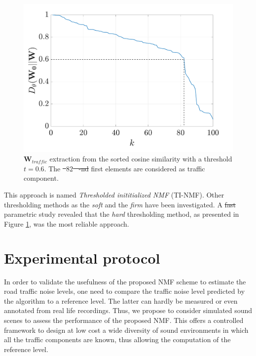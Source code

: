 \documentclass[twocolumn]{svjour3}          %
\providecommand{\DIFaddtex}[1]{{\protect\color{blue}\uwave{#1}}} %
\providecommand{\DIFdeltex}[1]{{\protect\color{red}\sout{#1}}}                      %
\providecommand{\DIFaddbegin}{} %
\providecommand{\DIFaddend}{} %
\providecommand{\DIFdelbegin}{} %
\providecommand{\DIFdelend}{} %
\providecommand{\DIFaddFL}[1]{\DIFadd{#1}} %
\providecommand{\DIFdelFL}[1]{\DIFdel{#1}} %
\providecommand{\DIFaddbeginFL}{} %
\providecommand{\DIFaddendFL}{} %
\providecommand{\DIFdelbeginFL}{} %
\providecommand{\DIFdelendFL}{} %
\providecommand{\DIFadd}[1]{\texorpdfstring{\DIFaddtex{#1}}{#1}} %
\providecommand{\DIFdel}[1]{\texorpdfstring{\DIFdeltex{#1}}{}} %
\begin{document}
\begin{figure}
[t]
\centering
\includegraphics[width=0.8\linewidth]{figures/distanceCosLinDisplay.pdf}
\caption{$\mathbf{W}_{traffic}$ extraction from the sorted cosine similarity with a threshold $t = 0.6$. The \DIFdelbeginFL \DIFdelFL{\mbox{%
$82$
}%
-nd }\DIFdelendFL first \DIFaddbeginFL \DIFaddFL{\mbox{%
$82$
}%
}\DIFaddendFL elements are \DIFaddbeginFL \DIFaddFL{here }\DIFaddendFL considered as traffic component.}
\label{fig:W_TI_NMF}
\end{figure}
This approach is named \textit{Thresholded inititialized NMF} (TI-NMF). Other thresholding methods as the \textit{soft} \cite{donoho1995noising} and the \textit{firm} \cite{fornasier2008iterative} have been investigated. A \DIFdelbegin \DIFdel{fast }\DIFdelend \DIFaddbegin \DIFadd{quick }\DIFaddend parametric study revealed that the \textit{hard} thresholding method, as presented in  Figure \ref{fig:W_TI_NMF}, was the most \DIFaddbegin \DIFadd{simple and }\DIFaddend reliable approach.

\section{Experimental protocol}\label{part:protocol}

In order to validate the usefulness of the proposed NMF scheme to estimate the road traffic noise levels, one need to compare the traffic noise level predicted by the algorithm to a reference level. The latter can hardly be measured or even annotated from real life recordings. Thus,  we propose to consider simulated sound scenes to assess the performance of the proposed NMF. This offers a controlled framework to design at low cost a wide diversity of sound environments in which all the traffic components are known, thus allowing the computation of the reference level.
\end{document}
